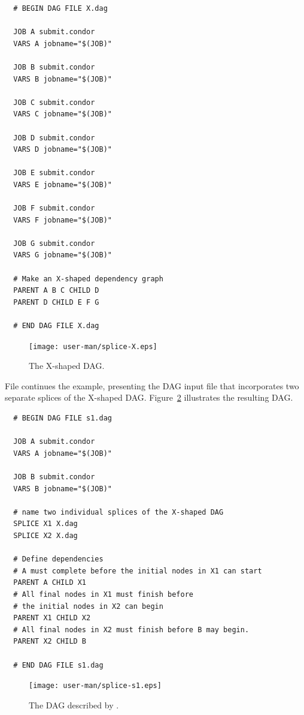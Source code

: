 \begin{verbatim}
  # BEGIN DAG FILE X.dag

  JOB A submit.condor
  VARS A jobname="$(JOB)"

  JOB B submit.condor
  VARS B jobname="$(JOB)"

  JOB C submit.condor
  VARS C jobname="$(JOB)"

  JOB D submit.condor
  VARS D jobname="$(JOB)"

  JOB E submit.condor
  VARS E jobname="$(JOB)"

  JOB F submit.condor
  VARS F jobname="$(JOB)"

  JOB G submit.condor
  VARS G jobname="$(JOB)"

  # Make an X-shaped dependency graph
  PARENT A B C CHILD D
  PARENT D CHILD E F G

  # END DAG FILE X.dag
\end{verbatim}

\begin{figure}
\centering
\texttt{[image: user-man/splice-X.eps]}
\caption{\label{fig:dagman-splice-X} The X-shaped DAG.}
\end{figure}


File  continues the example, presenting
the DAG input file that
incorporates two separate splices of the X-shaped DAG.
Figure~\ref{fig:dagman-splice-s1} illustrates the resulting DAG.

\begin{verbatim}
  # BEGIN DAG FILE s1.dag

  JOB A submit.condor
  VARS A jobname="$(JOB)"

  JOB B submit.condor
  VARS B jobname="$(JOB)"

  # name two individual splices of the X-shaped DAG
  SPLICE X1 X.dag
  SPLICE X2 X.dag

  # Define dependencies
  # A must complete before the initial nodes in X1 can start
  PARENT A CHILD X1
  # All final nodes in X1 must finish before 
  # the initial nodes in X2 can begin
  PARENT X1 CHILD X2
  # All final nodes in X2 must finish before B may begin.
  PARENT X2 CHILD B

  # END DAG FILE s1.dag

\end{verbatim}

\begin{figure}
\centering
\texttt{[image: user-man/splice-s1.eps]}
\caption{\label{fig:dagman-splice-s1} The DAG described by .}
\end{figure}




